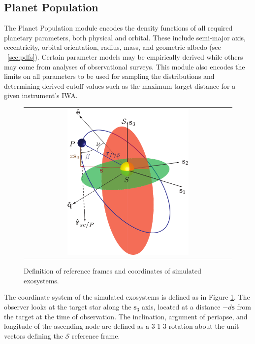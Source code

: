\documentclass[cleanfoot]{asme2ej}
\newcommand{\reffig}[1]{Figure \ref{#1}}
\begin{document}

\subsection{Planet Population}
The Planet Population module encodes the density functions of all required planetary parameters, both physical and orbital. These include semi-major axis, eccentricity, orbital orientation, radius, mass, and geometric albedo (see ~\ref{sec:pdfs}). Certain parameter models may be empirically derived while others may come from analyses of observational surveys.  This module also encodes the limits on all parameters to be used for sampling the distributions and determining derived cutoff values such as the maximum target distance for a given instrument's IWA.

\begin{figure}[ht]
    \begin{center}
        \begin{tabular}{c}
             \includegraphics[width=0.6\textwidth]{orbit_diagram}
        \end{tabular}
    \end{center}
    \caption{\label{fig:orbit_diagram} Definition of reference frames and coordinates of simulated exosystems.}
\end{figure}

The coordinate system of the simulated exosystems is defined as in \reffig{fig:orbit_diagram}.  The observer looks at the target star along the $\mathbf{s}_3$ axis, located at a distance $-d\mathbf{s}$ from the target at the time of observation. The inclination, argument of periapse, and longitude of the ascending node are defined as a 3-1-3 rotation about the unit vectors defining the $\mathcal{S}$ reference frame.
\end{document}
